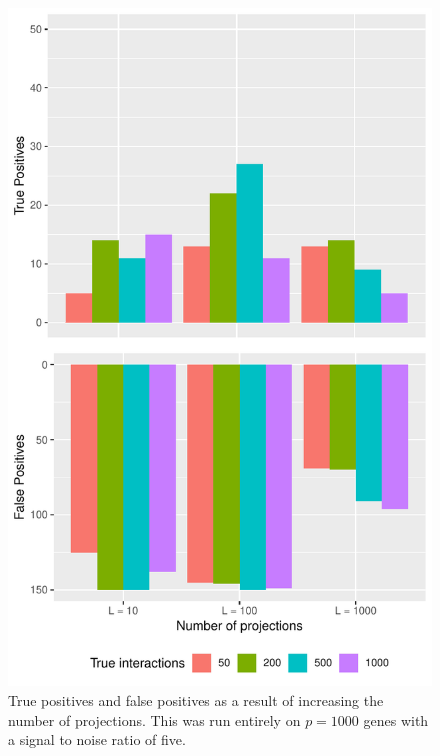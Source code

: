 \begin{figure}
	\begin{minipage}{\linewidth}
		\centering
		\includegraphics[width=0.5\linewidth]{"output/quant_analysis_n10000"}
	\end{minipage}
	\caption{True positives and false positives as a result of increasing the number of projections. This was run entirely on $p = 1000$ genes with a signal to noise ratio of five.}
\end{figure}





